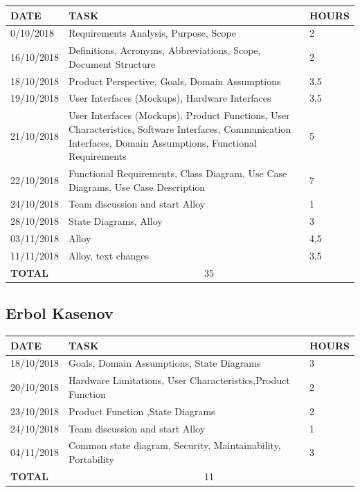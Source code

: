 \documentclass[12pt]{article}
\begin{document}
\begin{center}
\begin{tabular}{ |p{}|p{}|p{}| } 
 \hline
 \textbf{DATE} & \textbf{TASK} & \textbf{HOURS} \\ 
  \hline
  0/10/2018 & Requirements Analysis, Purpose, Scope & 2 \\ 
  \hline
  16/10/2018 & Definitions, Acronyms, Abbreviations, Scope, Document Structure & 2 \\ 
  \hline
  18/10/2018 & Product Perspective, Goals, Domain Assumptions & 3,5 \\ 
  \hline
  19/10/2018 & User Interfaces (Mockups), Hardware Interfaces & 3,5 \\ 
  \hline
  21/10/2018 & User Interfaces (Mockups), Product Functions, User Characteristics, Software Interfaces, Communication Interfaces, Domain Assumptions, Functional Requirements & 5 \\ 
  \hline
  22/10/2018 & Functional Requirements, Class Diagram, Use Case Diagrams, Use Case Description & 7 \\ 
  \hline
  24/10/2018 & Team discussion and start Alloy & 1 \\ 
  \hline
  28/10/2018 & State Diagrams, Alloy & 3 \\ 
  \hline
  03/11/2018 & Alloy & 4,5 \\ 
  \hline
  11/11/2018 & Alloy, text changes & 3,5 \\ 

  \hline
  \textbf{TOTAL} & \multicolumn{2}{c|}{35} \\ 
  \hline
\end{tabular}
\end{center}


\subsection{Erbol Kasenov}

\begin{center}
\begin{tabular}{ |p{}|p{}|p{}| } 
 \hline
 \textbf{DATE} & \textbf{TASK} & \textbf{HOURS} \\ 
  \hline
  18/10/2018 & Goals, Domain Assumptions, State Diagrams & 3\\ 
  \hline
  20/10/2018 & Hardware Limitations, User Characteristics,Product Function & 2 \\ 
  \hline
  23/10/2018 & Product Function ,State Diagrams & 2 \\ 
  \hline
  24/10/2018 & Team discussion and start Alloy & 1 \\ 
  \hline
  04/11/2018 & Common state diagram, Security,  Maintainability,  Portability & 3 \\
  \hline
  \textbf{TOTAL} & \multicolumn{2}{c|}{11} \\ 
  \hline
\end{tabular}
\end{center}
\end{document}
